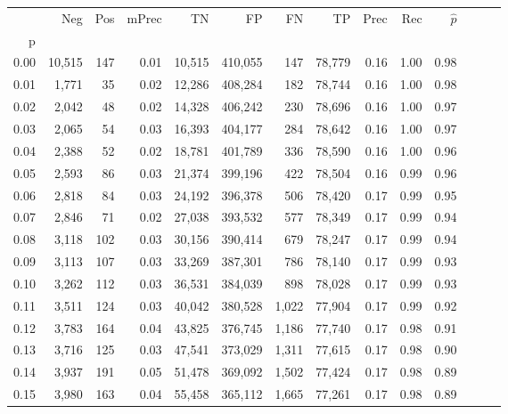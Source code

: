 \begin{tabular}{rrrrrrrrrrrrrr}
\toprule
{} &     Neg &    Pos & mPrec &       TN &       FP &      FN &      TP &  Prec &   Rec & $\hat{p}$ \\
p    &         &        &       &          &          &         &         &       &       &           \\
\midrule
0.00 &  10,515 &    147 &  0.01 &   10,515 &  410,055 &     147 &  78,779 &  0.16 &  1.00 &      0.98 \\
0.01 &   1,771 &     35 &  0.02 &   12,286 &  408,284 &     182 &  78,744 &  0.16 &  1.00 &      0.98 \\
0.02 &   2,042 &     48 &  0.02 &   14,328 &  406,242 &     230 &  78,696 &  0.16 &  1.00 &      0.97 \\
0.03 &   2,065 &     54 &  0.03 &   16,393 &  404,177 &     284 &  78,642 &  0.16 &  1.00 &      0.97 \\
0.04 &   2,388 &     52 &  0.02 &   18,781 &  401,789 &     336 &  78,590 &  0.16 &  1.00 &      0.96 \\
0.05 &   2,593 &     86 &  0.03 &   21,374 &  399,196 &     422 &  78,504 &  0.16 &  0.99 &      0.96 \\
0.06 &   2,818 &     84 &  0.03 &   24,192 &  396,378 &     506 &  78,420 &  0.17 &  0.99 &      0.95 \\
0.07 &   2,846 &     71 &  0.02 &   27,038 &  393,532 &     577 &  78,349 &  0.17 &  0.99 &      0.94 \\
0.08 &   3,118 &    102 &  0.03 &   30,156 &  390,414 &     679 &  78,247 &  0.17 &  0.99 &      0.94 \\
0.09 &   3,113 &    107 &  0.03 &   33,269 &  387,301 &     786 &  78,140 &  0.17 &  0.99 &      0.93 \\
0.10 &   3,262 &    112 &  0.03 &   36,531 &  384,039 &     898 &  78,028 &  0.17 &  0.99 &      0.93 \\
0.11 &   3,511 &    124 &  0.03 &   40,042 &  380,528 &   1,022 &  77,904 &  0.17 &  0.99 &      0.92 \\
0.12 &   3,783 &    164 &  0.04 &   43,825 &  376,745 &   1,186 &  77,740 &  0.17 &  0.98 &      0.91 \\
0.13 &   3,716 &    125 &  0.03 &   47,541 &  373,029 &   1,311 &  77,615 &  0.17 &  0.98 &      0.90 \\
0.14 &   3,937 &    191 &  0.05 &   51,478 &  369,092 &   1,502 &  77,424 &  0.17 &  0.98 &      0.89 \\
0.15 &   3,980 &    163 &  0.04 &   55,458 &  365,112 &   1,665 &  77,261 &  0.17 &  0.98 &      0.89 \\

\end{tabular}
